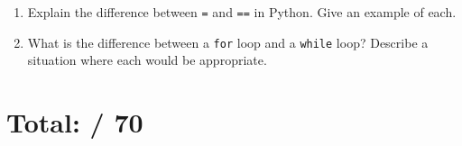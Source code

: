 \documentclass[12pt]{article}
\begin{document}
\begin{enumerate}[resume,label=\arabic*.]
    \item Explain the difference between \texttt{=} and \texttt{==} in Python. Give an example of each.

    \vspace{3cm}

    \item What is the difference between a \texttt{for} loop and a \texttt{while} loop? Describe a situation where each would be appropriate.

    \vspace{3cm}
\end{enumerate}

\section*{Total: \underline{\hspace{2cm}} / 70}
\end{document}
